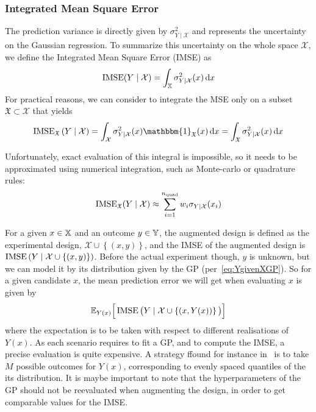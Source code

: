 \documentclass[../../Main_ManuscritThese.tex]{subfiles}
\begin{document}
\subsubsection{Integrated Mean Square Error}
\cite{sacks_designs_1989}
The prediction variance is directly given by $\sigma^2_{Y\mid \mathcal{X}}$ and represents the uncertainty on the Gaussian regression. To summarize this uncertainty on the whole space $\mathcal{X}$, we define the Integrated Mean Square Error (IMSE) as
\begin{equation}
  \operatorname{\mathrm{IMSE}}(Y \mid \mathcal{X}) = \int_{\mathbb{X}} \sigma_{Y\mid\mathcal{X}}^2(x)\,\mathrm{d}x
\end{equation}
For practical reasons, we can consider to integrate the MSE only on a subset $\mathfrak{X}\subset \mathcal{X}$ that yields
\begin{equation}
  \IMSE_{\mathfrak{X}}\left(Y \mid \mathcal{X} \right) = \int_{\mathcal{X}} \sigma^2_{Y\mid \mathcal{X}}(x)  \mathbbm{1}_{\mathfrak{X}}(x)\,\mathrm{d}x = \int_{\mathfrak{X}} \sigma^2_{Y\mid \mathcal{X}}(x)\,\mathrm{d}x
\end{equation}

Unfortunately, exact evaluation of this integral is impossible, so it needs to be approximated using numerical integration, such as Monte-carlo or quadrature rules:
\begin{equation}
  \operatorname{\mathrm{IMSE}}_{\mathfrak{X}}(Y\mid \mathcal{X}) \approx \sum_{i=1}^{n_{\mathrm{quad}}} w_i \sigma_{Y\mid\mathcal{X}}(x_i)
\end{equation}

For a given $x\in \mathbb{X}$ and an outcome $y\in\mathbb{Y}$, the augmented design is defined as the experimental design, $\mathcal{X} \cup \left\{(x, y)\right\}$, and the IMSE of the augmented design is $\operatorname{\mathrm{IMSE}}\left(Y \mid \mathcal{X} \cup \left\{(x, y)\right\} \right)$.
Before the actual experiment though, $y$ is unknown, but we can model it by its distribution given by the GP (per~\cref{eq:YgivenXGP}). So for a given candidate $x$, the mean prediction error we will get when evaluating $x$ is given by
\begin{equation}
  \label{eq:IMSE_augmented}
  \mathbb{E}_{Y(x)}\Big[\operatorname{\mathrm{IMSE}}\big(Y \mid \mathcal{X} \cup \left\{(x, Y(x))\right\} \big)\Big]
\end{equation}
where the expectation is to be taken with respect to different realisations of $Y(x)$. As each scenario requires to fit a GP, and to compute the IMSE, a precise evaluation is quite expensive. A strategy ffound for instance in~\cite{villemonteix_informational_2006} is to take $M$ possible outcomes for $Y(x)$, corresponding to evenly spaced quantiles of the its distribution.
It is maybe important to note that the hyperparameters of the GP should not be reevaluated when augmenting the design, in order to get comparable values for the IMSE.
\end{document}
